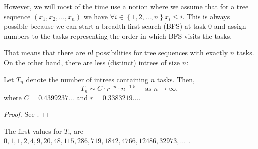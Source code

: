 \begin{center}
\end{center}

However, we will most of the time use a notion where we assume that for a tree sequence $(x_1,x_2,\dots, x_n)$ we have $\forall i \in \left\{ 1,2,\dots,n \right\}x_i\leq i$. This is always possible because we can start a breadth-first search (BFS) at task 0 and assign numbers to the tasks representing the order in which BFS visits the tasks.

That means that there are $n!$ possibilities for tree sequences with exactly $n$ tasks. On the other hand, there are less (distinct) intrees of size $n$:

\begin{theorem}
  Let $T_n$ denote the number of intrees containing $n$ tasks. Then,
  \begin{equation*}
    T_n \sim C\cdot r^{-n}\cdot n^{-1.5} 
    \quad \text{ as } n\rightarrow \infty,
  \end{equation*}
  where $C=0.4399237\dots$ and $r=0.3383219\dots$.
\end{theorem}

\begin{proof}
  See \cite{asymptotic_enum_odlyzko}.
\end{proof}

The first values for $T_n$ are $0, 1, 1, 2, 4, 9, 20, 48, 115, 286, 719, 1842, 4766, 12486, 32973, \dots$ \cite{oeisrootedtrees}.


